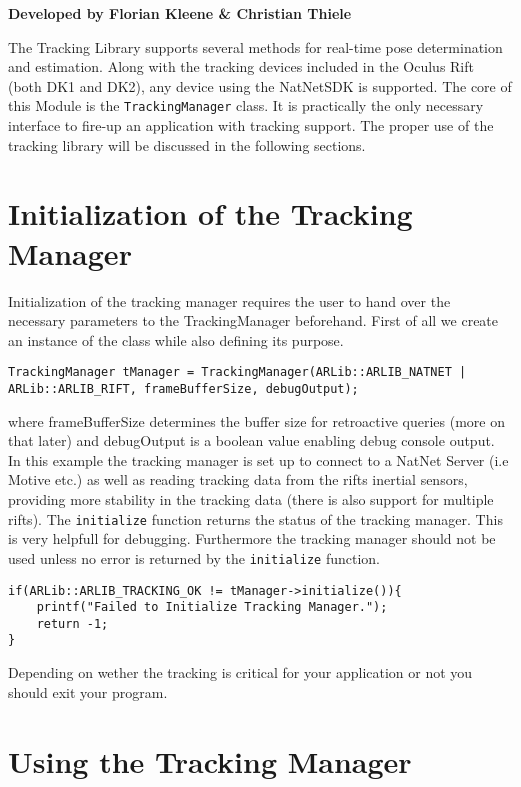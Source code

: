 \begin{center}
\textbf{Developed by Florian Kleene \& Christian Thiele}
\end{center}
The Tracking Library supports several methods for real-time pose determination and estimation. Along with the tracking devices included in the Oculus Rift (both DK1 and DK2\cite{dk2}), any device using the NatNetSDK\cite{optitrack} is supported. The core of this Module is the \texttt{TrackingManager} class. It is practically the only necessary interface to fire-up an application with tracking support. The proper use of the tracking library will be discussed in the following sections.
\section{Initialization of the Tracking Manager}\label{tracking-manager-initialization}

Initialization of the tracking manager requires the user to hand over the necessary parameters to the TrackingManager beforehand. First of all we create an instance of the class while also defining its purpose.

\begin{lstlisting}
TrackingManager tManager = TrackingManager(ARLib::ARLIB_NATNET | ARLib::ARLIB_RIFT, frameBufferSize, debugOutput);
\end{lstlisting}
where frameBufferSize determines the buffer size for retroactive queries (more on that later) and debugOutput is a boolean value enabling debug console output. In this example the tracking manager is set up to connect to a NatNet Server (i.e Motive etc.) as well as reading tracking data from the rifts inertial sensors, providing more stability in the tracking data (there is also support for multiple rifts).
The \texttt{initialize} function returns the status of the tracking manager. This is very helpfull for debugging. Furthermore the tracking manager should not be used unless no error is returned by the \texttt{initialize} function.

\begin{lstlisting}
if(ARLib::ARLIB_TRACKING_OK != tManager->initialize()){
    printf("Failed to Initialize Tracking Manager.");
    return -1;
}
\end{lstlisting}
Depending on wether the tracking is critical for your application or not you should exit your program.

\section{Using the Tracking Manager}\label{using-the-tracking-manager}

